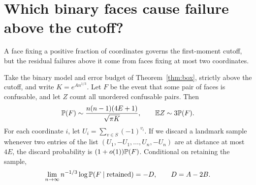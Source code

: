\section{Which binary faces cause failure above the cutoff?}
A face fixing a positive fraction of coordinates governs the first-moment
cutoff, but the residual failures above it come from faces fixing at most two
coordinates.

\begin{corollary}\label{cor:rare-faces}
Take the binary model and error budget of Theorem~\ref{thm:box}, strictly
above the cutoff, and write \(K=e^{A n^{1/3}}\). Let \(F\) be the event that
some pair of faces is confusable, and let \(Z\) count all unordered confusable
pairs. Then
\[
 \mathbb P(F)\sim\frac{n(n-1)(4E+1)}{\sqrt{\pi K}},
 \qquad \mathbb E Z\sim 3\mathbb P(F).
\]
For each coordinate \(i\), let \(U_i=\sum_{v\in S}(-1)^{v_i}\).
If we discard a landmark sample whenever two entries of the list
\((U_1,-U_1,\ldots,U_n,-U_n)\) are at distance at most \(4E\),
the discard probability is \((1+o(1))\mathbb P(F)\). Conditional on retaining
the sample,
\[
 \lim_{n\to\infty}n^{-1/3}\log\mathbb P(F\mid\text{retained})=-D,
 \qquad D=A-2B.
\]
\end{corollary}

